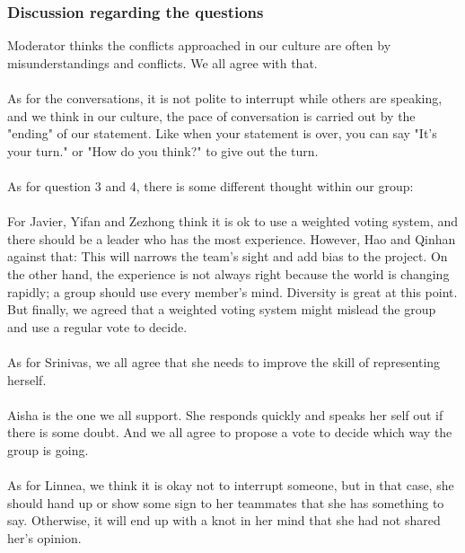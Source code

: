 		\subsubsection{Discussion regarding the questions}
		Moderator thinks the conflicts approached in our culture are often by misunderstandings and conflicts.  We all agree with that.\\\\
		As for the conversations, it is not polite to interrupt while others are speaking, and we think in our culture, the pace of conversation is carried out by the "ending" of our statement. Like when your statement is over, you can say "It's your turn." or "How do you think?" to give out the turn. \\\\
		As for question 3 and 4, there is some different thought within our group:\\\\
		For Javier, Yifan and Zezhong think it is ok to use a weighted voting system, and there should be a leader who has the most experience. However, Hao and Qinhan against that: This will narrows the team's sight and add bias to the project. On the other hand, the experience is not always right because the world is changing rapidly; a group should use every member's mind. Diversity is great at this point. But finally, we agreed that a weighted voting system might mislead the group and use a regular vote to decide.\\\\
		As for Srinivas, we all agree that she needs to improve the skill of representing herself.\\\\
		Aisha is the one we all support. She responds quickly and speaks her self out if there is some doubt. And we all agree to propose a vote to decide which way the group is going.\\\\
		As for Linnea, we think it is okay not to interrupt someone, but in that case, she should hand up or show some sign to her teammates that she has something to say. Otherwise, it will end up with a knot in her mind that she had not shared her's opinion.
		
		